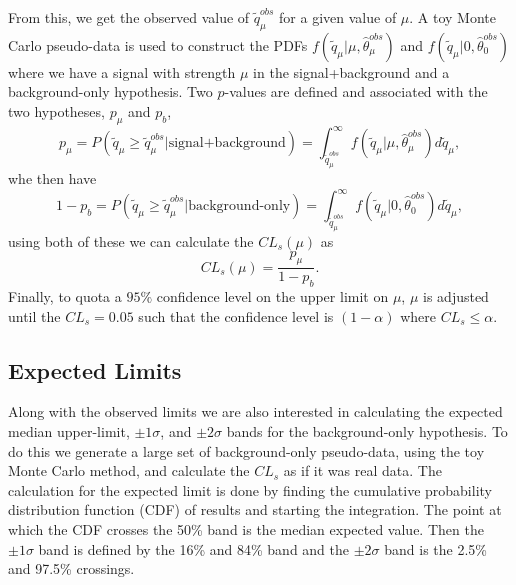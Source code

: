 From this, we get the observed value of $\widetilde{q}_\mu^{obs}$ for a given value of $\mu$. A toy Monte Carlo pseudo-data is used to construct the PDFs $f(\widetilde{q}_\mu|\mu,\hat{\theta}_\mu^{obs})$ and $f(\widetilde{q}_\mu|0,\hat{\theta}_0^{obs})$ where we have a signal with strength $\mu$ in the signal+background and a background-only hypothesis. Two $p$-values are defined and associated with the two hypotheses, $p_\mu$ and $p_b$,
\begin{equation}\label{eqn:splusb}
p_\mu=P(\widetilde{q}_\mu\geq\widetilde{q}_\mu^{obs}|\text{signal+background})=\int_{\widetilde{q}_\mu^{obs}}^{\infty}f(\widetilde{q}_\mu|\mu,\hat{\theta}_\mu^{obs})d\widetilde{q}_\mu,
\end{equation} \label{eqn:b}
whe then have
\begin{equation}
1-p_b=P(\widetilde{q}_\mu\geq\widetilde{q}_\mu^{obs}|\text{background-only})=\int_{\widetilde{q}_\mu^{obs}}^{\infty}f(\widetilde{q}_\mu|0,\hat{\theta}_0^{obs})d\widetilde{q}_\mu,
\end{equation}
using both of these we can calculate the $CL_s(\mu)$ as 
\begin{equation}
CL_s(\mu)=\frac{p_\mu}{1-p_b}.
\end{equation}
Finally, to quota a $95\%$ confidence level on the upper limit on $\mu$, $\mu$ is adjusted until the $CL_s=0.05$ such that the confidence level is $(1-\alpha)$ where $CL_s\leq\alpha$. 

\subsection{Expected Limits}\label{sec:ExpLimits}

Along with the observed limits we are also interested in calculating the expected median upper-limit, $\pm1\sigma$, and $\pm2\sigma$ bands for the background-only hypothesis. To do this we generate a large set of background-only pseudo-data, using the toy Monte Carlo method, and calculate the $CL_s$ as if it was real data. The calculation for the expected limit is done by finding the cumulative probability distribution function (CDF) of results and starting the integration. The point at which the CDF crosses the 50\% band is the median expected value. Then the $\pm1\sigma$ band is defined by the 16\% and 84\% band and the $\pm2\sigma$ band is the 2.5\% and 97.5\% crossings. 